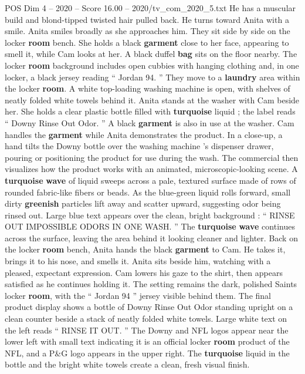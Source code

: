 \begin{textsample}{POS Dim 4 – 2020 – Score 16.00 – 2020/tv\_com\_2020\_5.txt}
He has a muscular build and blond-tipped twisted hair pulled back.
He turns toward Anita with a smile.
Anita smiles broadly as she approaches him.
They sit side by side on the locker \textbf{room} bench.
She holds a black \textbf{garment} close to her face, appearing to smell it, while Cam looks at her.
A black duffel \textbf{bag} sits on the floor nearby.
The locker \textbf{room} background includes open cubbies with hanging clothing and, in one locker, a black jersey reading “ Jordan 94. ” They move to a \textbf{laundry} area within the locker \textbf{room}.
A white top-loading washing machine is open, with shelves of neatly folded white towels behind it.
Anita stands at the washer with Cam beside her.
She holds a clear plastic bottle filled with \textbf{turquoise} liquid ; the label reads “ Downy Rinse Out Odor. ” A black \textbf{garment} is also in use at the washer.
Cam handles the \textbf{garment} while Anita demonstrates the product.
In a close-up, a hand tilts the Downy bottle over the washing machine ’s dispenser drawer, pouring or positioning the product for use during the wash.
The commercial then visualizes how the product works with an animated, microscopic-looking scene.
A \textbf{turquoise} \textbf{wave} of liquid sweeps across a pale, textured surface made of rows of rounded fabric-like fibers or beads.
As the blue-green liquid rolls forward, small dirty \textbf{greenish} particles lift away and scatter upward, suggesting odor being rinsed out.
Large blue text appears over the clean, bright background : “ RINSE OUT IMPOSSIBLE ODORS IN ONE WASH. ” The \textbf{turquoise} \textbf{wave} continues across the surface, leaving the area behind it looking cleaner and lighter.
Back on the locker \textbf{room} bench, Anita hands the black \textbf{garment} to Cam.
He takes it, brings it to his nose, and smells it.
Anita sits beside him, watching with a pleased, expectant expression.
Cam lowers his gaze to the shirt, then appears satisfied as he continues holding it.
The setting remains the dark, polished Saints locker \textbf{room}, with the “ Jordan 94 ” jersey visible behind them.
The final product display shows a bottle of Downy Rinse Out Odor standing upright on a clean counter beside a stack of neatly folded white towels.
Large white text on the left reads “ RINSE IT OUT. ” The Downy and NFL logos appear near the lower left with small text indicating it is an official locker \textbf{room} product of the NFL, and a P\&G logo appears in the upper right.
The \textbf{turquoise} liquid in the bottle and the bright white towels create a clean, fresh visual finish.

\end{textsample}
